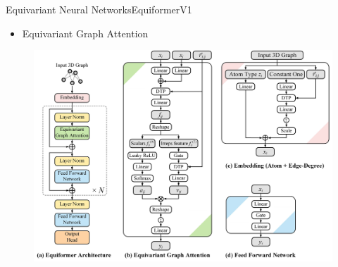\documentclass[pdf,serif]{beamer}
\begin{document}
\begin{frame}{Equivariant Neural Networks}{EquiformerV1}
    \begin{itemize}
        \item Equivariant Graph Attention \citep{liao2022equiformer}
    \end{itemize}
    \begin{figure}
        \includegraphics[width=0.8\linewidth]{images/equiformer}
    \end{figure}
\end{frame}
\end{document}
